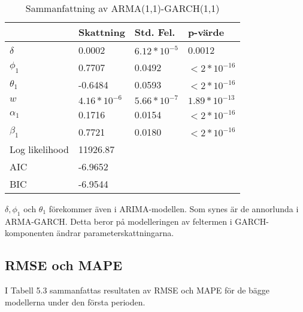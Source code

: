 \documentclass[11pt]{article}
\numberwithin{equation}{section}
\numberwithin{table}{section}
\numberwithin{figure}{section}
\begin{document}
\begin{table}[H]
\centering
\caption{Sammanfattning av ARMA(1,1)-GARCH(1,1)}
\begin{tabular}{||llll||}
\hline
              & \textbf{Skattning}  & \textbf{Std. Fel.} & \textbf{p-värde}          \\
              \hline \hline
$\delta$      & 0.0002         & $6.12*10^{-5}$ & 0.0012           \\
$\phi_1$      & 0.7707         & 0.0492         & $<2*10^{-16}$    \\
$\theta_1$    & -0.6484        & 0.0593         & $<2*10^{-16}$    \\
$w$           & $4.16*10^{-6}$ & $5.66*10^{-7}$ & $1.89*10^{-13}$  \\
$\alpha_1$    & 0.1716         & 0.0154         & $<2*10^{-16}$    \\
$\beta_1$     & 0.7721         & 0.0180         & $<2*10^{-16}$    \\ 
\hline \hline
Log likelihood & 11926.87       &                &                  \\
AIC           & -6.9652        &                &                  \\
BIC           & -6.9544        &                &          \\
\hline
\end{tabular}
\end{table}

$\delta, \phi_1$ och $\theta_1$ förekommer även i ARIMA-modellen. Som synes är de annorlunda i ARMA-GARCH. Detta beror på modelleringen av feltermen i GARCH-komponenten ändrar parameterskattningarna.

\subsection{RMSE och MAPE}
I Tabell 5.3 sammanfattas resultaten av RMSE och MAPE för de bägge modellerna under den första perioden.
\end{document}
